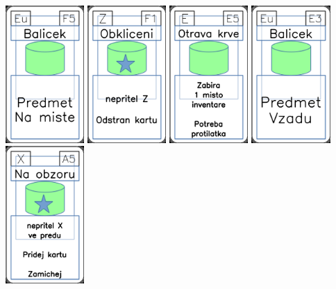 \documentclass[a4paper]{article}
\begin{document}
	\includegraphics[width=3.0cm]{img-4_29}
	\includegraphics[width=3.0cm]{img-5_55}
	\includegraphics[width=3.0cm]{img-4_54}
	\includegraphics[width=3.0cm]{img-4_22}
	\includegraphics[width=3.0cm]{img-5_4}
\end{document}
